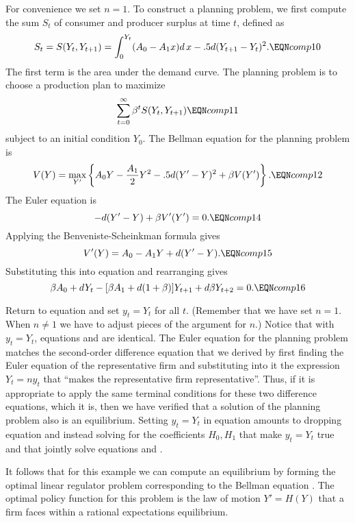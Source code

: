 For convenience we set $n=1$.
To construct a planning problem, we first compute
the sum $S_t$ of  consumer and producer surplus at time $t$, defined as
$$ S_t = S(Y_t, Y_{t+1}) = \int_0^{Y_t} (A_0 - A_1 x) d \, x
      -.5 d (Y_{t+1} - Y_t)^2. \EQN comp10 $$
The first term is the area under the demand curve.
The planning problem is to choose a production
plan to maximize
$$   \sum_{t=0}^\infty \beta^t S(Y_t, Y_{t+1}) \EQN comp11 $$
subject to an initial condition $Y_0$.
The Bellman equation for the planning problem is
$$ V(Y) = \max_{Y'}\left\{A_0  Y - {A_1 \over 2} Y^2 - .5 d (Y' - Y)^2
     + \beta V(Y') \right\}. \EQN comp12 $$
The Euler equation is
$$ - d(Y' - Y) + \beta V'(Y') = 0. \EQN comp14 $$
Applying the Benveniste-Scheinkman formula %
  gives
$$ V'(Y) = A_0 - A_1 Y + d(Y' - Y) . \EQN comp15 $$
Substituting this into equation  and rearranging gives
$$ \beta A_0 + d Y_t - [\beta A_1 + d(1+ \beta)]Y_{t+1} + d \beta Y_{t+2} =0 .
         \EQN comp16 $$

Return to equation
 and set $y_t = Y_t$ for all $t$. (Remember
that we have set $n=1$. When $n \neq 1$ we have to adjust
pieces of the argument for $n$.)
Notice that with $y_t=Y_t$, equations  and  are identical.
The Euler equation for the planning problem matches the second-order difference equation
that we derived by first finding the Euler equation of the representative firm and substituting into
it the expression $Y_t = n y_t$ that ``makes the representative firm representative''.  Thus, if
 it is appropriate to apply  the same terminal conditions for these two difference equations, which it is,
then we have verified that  a solution of the planning problem also is an equilibrium.
Setting $y_t = Y_t$ in
equation  amounts to dropping equation  and instead
solving for the coefficients $H_0, H_1$ that make
$y_t = Y_t$ true and that jointly solve equations
 and .

It follows that for this example we can compute an equilibrium
by forming the optimal linear regulator problem corresponding
to the Bellman equation .    The optimal policy
function for this problem is the  law of motion $Y'=H(Y)$ that a firm faces within a rational
expectations equilibrium. 
